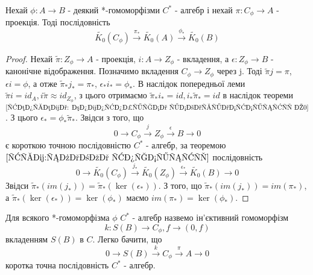 \begin{lemma}
    Нехай $\phi: A \to B$ - деякий *-гомоморфізми $C^*$ - алгебр і нехай $\pi: C_\phi \to A$ - проекція.
    Тоді послідовність
    \begin{equation*}
        \widetilde{K_0}(C_\phi) \xrightarrow{\pi_*} \widetilde{K_0}(A) \xrightarrow{\phi_*} \widetilde{K_0}(B)
    \end{equation*}
    \begin{proof}
        Нехай $\tilde{\pi}: Z_\phi \to A$ - проекція, $i: A \to Z_\phi$ - вкладення,
        а $\epsilon: Z_\phi \to B$ - канонічне відображення.
        Позначимо вкладення $C_\phi \to Z_\phi$ через j.
        Тоді $\tilde{\pi} j = \pi$, $\epsilon i = \phi$, а отже $\tilde{\pi}_* j_* = \pi_*$, $\epsilon_* i_* = \phi_*$.
        В наслідок попередньої леми $\tilde{\pi}i = id_A, i\tilde{\pi} \approx id_{Z_\phi}$, з цього отримаємо
        $\tilde{\pi}_*i_* = id, i_*\tilde{\pi}_* = id$ в наслідок теореми $\ref{теорема: гомотопічна інваріантність К0}$.
        З цього $\epsilon_* = \phi_* \tilde{\pi}_*$.
        Звідси з того, що
        \begin{equation*}
            0 \to C_\phi \xrightarrow{j} Z_\phi \xrightarrow{\epsilon} B \to 0
        \end{equation*}
        є короткою точною послідовністю $C^*$ - алгебр, за теоремою $\ref{трм:слабка точність}$ послідовність
        \begin{equation*}
            0 \to \widetilde{K_0}(C_\phi) \xrightarrow{j_*} \widetilde{K_0}(Z_\phi)  \xrightarrow{\epsilon_*} \widetilde{K_0}(B) \to 0
        \end{equation*}
        Звідси $\tilde{\pi}_*(im(j_*)) = \tilde{\pi}_*(\ker(\epsilon_*))$.
        З того, що $\tilde{\pi}_*(im(j_*)) = im(\pi_*)$, а $\tilde{\pi}_*(\ker(\epsilon_*)) = \ker(\phi_*)$
        маємо $im(\pi_*) =  \ker(\phi_*)$.
    \end{proof}
\end{lemma}

Для всякого *-гомоморфізма $\phi$ $C^*$ - алгебр назвемо ін'єктивний гомоморфізм
\begin{equation*}
    k: S(B) \to C_\phi, f \to (0, f)
\end{equation*}
вкладенням $S(B)$ в $C$.
Легко бачити, що
\begin{equation*}
    0 \to S(B) \xrightarrow{k} C_\phi \xrightarrow{\pi} A \to 0
\end{equation*}
коротка точна послідовність $C^*$ - алгебр.

